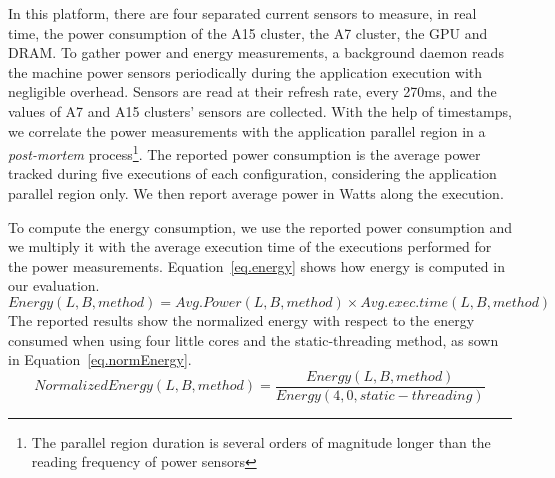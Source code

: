 
In this platform, there are four separated current sensors to measure, in real time, the power consumption of the A15 cluster, the A7 cluster, the GPU and DRAM. 
To gather power and energy measurements, a background daemon reads the machine power sensors periodically during the application execution with negligible overhead. 
Sensors are read at their refresh rate, every 270ms, and the values of A7 and A15 clusters' sensors are collected.
With the help of timestamps, we correlate the power measurements with the application parallel region in a \emph{post-mortem} process\footnote{The parallel region duration is several orders of magnitude longer than the reading frequency of power sensors}. 
The reported power consumption is the average power tracked during five executions of each configuration, considering the application parallel region only. 
We then report average power in Watts along the execution. 

To compute the energy consumption, we use the reported power consumption and we multiply it with the average execution time of the executions performed for the power measurements. 
Equation~\ref{eq.energy} shows how energy is computed in our evaluation.
\begingroup\makeatletter\def\f@size{10}\check@mathfonts
\begin{equation}
\text{$Energy(L, B, method) = Avg. Power(L, B, method) \times Avg. exec. time(L, B, method)$}
\label{eq.energy}
\end{equation}
The reported results show the normalized energy with respect to the energy consumed when using four little cores and the static-threading method, as sown in Equation~\ref{eq.normEnergy}.
\begingroup\makeatletter\def\f@size{10}\check@mathfonts
\begin{equation}
\text{$Normalized Energy(L, B, method)$} = \frac{\text{$Energy(L, B, method)$}}{\text{$Energy(4, 0, static-threading)$}}
\label{eq.normEnergy}
\end{equation}

